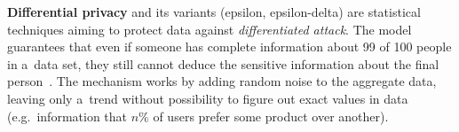 \textbf{Differential privacy} and its variants (epsilon, epsilon-delta) are statistical techniques aiming to protect data against \textit{differentiated attack}.
The model guarantees that even if someone has complete information about 99 of 100 people in a~data set, they still cannot deduce the sensitive information about the final person~\cite{web:differential-privacy}.
The mechanism works by adding random noise to the aggregate data, leaving only a~trend without possibility to figure out exact values in data (e.g.\ information that \( n\% \) of users prefer some product over another).

